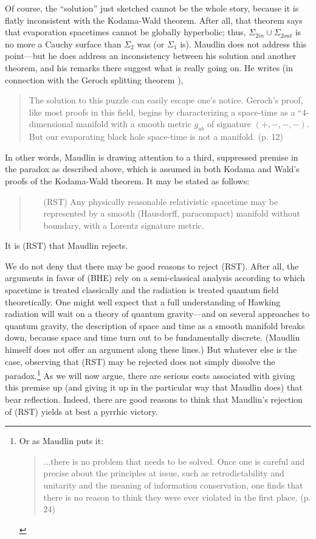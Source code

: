 \documentclass[authoryear,12pt,3p]{jowarticle}
\begin{document}
Of course, the ``solution'' just sketched cannot be the whole story, because it is flatly inconsistent with the Kodama-Wald theorem.  After all, that theorem says that evaporation spacetimes cannot be globally hyperbolic; thus, $\Sigma_{2in}\cup\Sigma_{2out}$ is no more a Cauchy surface than $\Sigma_2$ was (or $\Sigma_1$ is).  Maudlin does not address this point---but he does address an inconsistency between his solution and another theorem, and his remarks there suggest what is really going on.  He writes (in connection with the Geroch splitting theorem \citep{GerochSplitting}),
\begin{quote}
The	solution to	this puzzle	can	easily escape one's notice.	Geroch's proof,	like most proofs in	this field,	begins by characterizing a	space-time as a “4-dimensional manifold	with a	smooth metric $g_{ab}$ of signature	$(+,-,-,-)$.  But our evaporating black	hole space-time	is not a manifold. (p. 12)
\end{quote}
In other words, Maudlin is drawing attention to a third, suppressed premise in the paradox as described above, which is assumed in both Kodama and Wald's proofs of the Kodama-Wald theorem.  It may be stated as follows:
\begin{quote}
\begin{itemize}
\item[(RST)] Any physically reasonable relativistic spacetime may be represented by a smooth (Hausdorff, paracompact) manifold without boundary, with a Lorentz signature metric.
\end{itemize}
\end{quote}
It is (RST) that Maudlin rejects.

We do not deny that there may be good reasons to reject (RST).  After all, the arguments in favor of (BHE) rely on a semi-classical analysis according to which spacetime is treated classically and the radiation is treated quantum field theoretically.  One might well expect that a full understanding of Hawking radiation will wait on a theory of quantum gravity---and on several approaches to quantum gravity, the description of space and time as a smooth manifold breaks down, because space and time turn out to be fundamentally discrete.  (Maudlin himself does not offer an argument along these lines.)  But whatever else is the case, observing that (RST) may be rejected does not simply dissolve the paradox.\footnote{Or as Maudlin puts it: \begin{quote} ...there is no problem that needs to be solved. Once one is careful and precise about the	principles at issue, such as retrodictability and unitarity and the meaning of	information	conservation, one finds	that there is no reason	to think they were ever	violated in	the	first place. (p. 24)\end{quote}}  As we will now argue, there are serious costs associated with giving this premise up (and giving it up in the particular way that Maudlin does) that bear reflection.  Indeed, there are good reasons to think that Maudlin's rejection of (RST) yields at best a pyrrhic victory.
\end{document}
